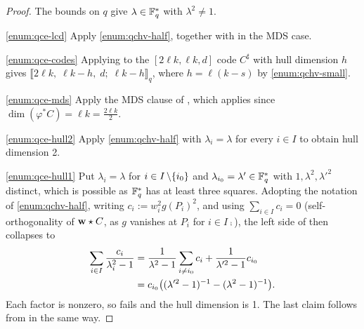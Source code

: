 \documentclass[twocolumn, 11pt]{scrartcl}
\begin{document}
\begin{proof}
    The bounds on $q$ give $\lambda\in\bbF_q^*$ with $\lambda^2\neq1$.
    
    \ref{enum:qce-lcd} Apply \ref{enum:qchv-half}, together with  in the MDS case.
    
    \ref{enum:qce-codes} Applying  to the $[2\ell k,\ell k,d]$ code $C^\sharp$ with hull dimension $h$ gives $\llbracket2\ell k,\;\ell k-h,\;d;\;\ell k-h\rrbracket_q$, where $h=\ell(k-s)$ by \ref{enum:qchv-small}.
    
    \ref{enum:qce-mds} Apply the MDS clause of , which applies since $\dim(\varphi^*C)=\ell k=\frac{2\ell k}{2}$.
    
    \ref{enum:qce-hull2} Apply \ref{enum:qchv-half} with $\lambda_i=\lambda$ for every $i\in I$ to obtain hull dimension 2.
    
    \ref{enum:qce-hull1} Put $\lambda_i=\lambda$ for $i\in I\bs\set{i_0}$ and $\lambda_{i_0}=\lambda'\in\bbF_q^*$ with $1,\lambda^2,\lambda'^2$ distinct, which is possible as $\bbF_q^*$ has at least three squares. Adopting the notation of \ref{enum:qchv-half}, writing $c_i:=w_i^2 g(P_i)^2$, and using $\sum_{i\in I} c_i=0$ (self-orthogonality of $\bfw\star C$, as $g$ vanishes at $P_i$ for $i\in I\comp$), the left side of  then collapses to
    \begin{align*}
        \sum_{i\in I}\frac{c_i}{\lambda_i^2-1}&=\frac{1}{\lambda^2-1}\sum_{i\neq i_0} c_i+\frac{1}{\lambda'^2-1} c_{i_0} \\
        &=c_{i_0}\pa[\big]{(\lambda'^2-1)^{-1}-(\lambda^2-1)^{-1}}.
    \end{align*}
    Each factor is nonzero, so  fails and the hull dimension is 1. The last claim follows from  in the same way.
\end{proof}
\end{document}
